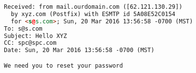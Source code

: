 \begin{lstlisting}[language=HTML,caption={SMTP headers generated by a PHP mailing
  script.},label={code:smtpheaders}, float]
Received: from mail.ourdomain.com ([62.121.130.29])
  by xyz.com (Postfix) with ESMTP id 5A08E52C0154
  for <s@s.com>; Sun, 20 Mar 2016 13:56:58 -0700 (MST)
To: s@s.com
Subject: Hello XYZ
CC: spc@spc.com
Date: Sun, 20 Mar 2016 13:56:58 -0700 (MST)

We need you to reset your password
\end{lstlisting}
